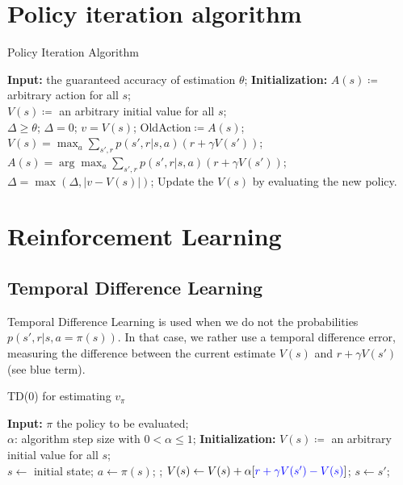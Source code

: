 \documentclass[12pt, openany]{report}
\theoremstyle{definition}
\begin{document}
\section{Policy iteration algorithm}
\begin{algorithm}
	\caption{Policy Iteration Algorithm}
	\begin{algorithmic}[1]
		\State \textbf{Input: } the guaranteed accuracy of estimation $\theta$;
		\State \textbf{Initialization: } $A(s)\coloneqq$ arbitrary action for all $s$;\\
		\quad \qquad \qquad \qquad $V(s)\coloneqq$ an arbitrary initial value for all $s$;\\ 
		\quad \qquad \qquad \qquad $\Delta \ge \theta$;
		\While {$\Delta \ge \theta$}
		\State $\Delta = 0$;
		\State $v=V(s)$;
		\State OldAction$\coloneqq A(s)$;
		\State $V(s) = \max_a \sum_{s',r}p(s',r|s,a)(r+\gamma V(s'))$;
		\State $A(s) = \arg\max_a \sum_{s',r}p(s',r|s,a)(r+\gamma V(s'))$;
		\State $\Delta = \max (\Delta, |v-V(s)|)$;
		\EndFor
		\State Update the $V(s)$ by evaluating the new policy.
		\EndWhile
	\end{algorithmic}
\end{algorithm}	
\section{Reinforcement Learning}
\subsection{Temporal Difference Learning}
Temporal Difference Learning is used when we do not the probabilities $p(s',r|s,a=\pi(s))$. In that case, we rather use a temporal difference error, measuring the difference between the current estimate $V(s)$ and $r+\gamma V(s')$ (see blue term). 
\begin{algorithm}
	\caption{TD(0) for estimating $v_\pi$}
	\begin{algorithmic}[1]
		\State \textbf{Input: } $\pi$ the policy to be evaluated;\\
		\qquad \qquad $\alpha$: algorithm step size with $0<\alpha \le 1$;
		\State \textbf{Initialization: } $V(s)\coloneqq$ an arbitrary initial value for all $s$;\\ 
		\For {}
		\State $s\gets$ initial state;
		\For {}
		\State $a\gets \pi(s)$;
		\State {};
		\State $V(s) \gets V(s)+\alpha[\color{blue}r+\gamma V(s')-V(s)\color{black}]$;
		\State $s\gets s'$;
		\EndFor
		\EndWhile 
		\EndFor
	\end{algorithmic}
\end{algorithm}
\end{document}
